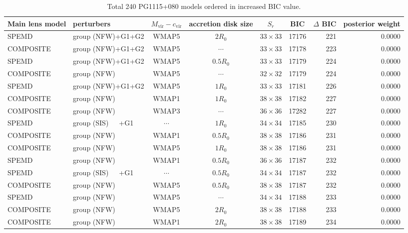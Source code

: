 \documentclass[useAMS,usenatbib]{mnras}
\def\nomicro{$\cdots$}
\def\nodata{$\cdots$}
\begin{document}
\begin{table}
    \centering
    \caption{Total 240 PG1115+080 models ordered in increased BIC value.}
    \label{tab:6TD}
    \begin{tabular}{llccccrr}
        \hline
        Main lens model & perturbers &$M_{\textrm{vir}}-c_{\textrm{vir}}$& accretion disk size & $S_{r}$ & BIC & $\Delta$ BIC & posterior weight\\
        \hline
        SPEMD     & group (NFW)+G1+G2 &WMAP5 & $2R_{0}$&$33\times33$ & 17176 & 221 & 0.0000\\
        COMPOSITE & group (NFW)+G1+G2 &WMAP5 & \nomicro&$33\times33$ & 17178 & 223 & 0.0000\\
        SPEMD     & group (NFW)+G1+G2 &WMAP5 & $0.5R_{0}$&$33\times33$ & 17179 & 224 & 0.0000\\
        COMPOSITE & group (NFW)       &WMAP5 & \nomicro&$32\times32$ & 17179 & 224 & 0.0000\\
        SPEMD     & group (NFW)+G1+G2 &WMAP5 & $1R_{0}$&$33\times33$ & 17181 & 226 & 0.0000\\
        COMPOSITE & group (NFW)       &WMAP1 & $1R_{0}$&$38\times38$ & 17182 & 227 & 0.0000\\
        COMPOSITE & group (NFW)       &WMAP3 & \nomicro&$36\times36$ & 17282 & 227 & 0.0000\\
        SPEMD     & group (SIS)~~~+G1 &\nodata& $1R_{0}$&$34\times34$ & 17185 & 230 & 0.0000\\
        COMPOSITE & group (NFW)       &WMAP1 & $0.5R_{0}$&$38\times38$ & 17186 & 231 & 0.0000\\
        COMPOSITE & group (NFW)       &WMAP5 & $1R_{0}$&$38\times38$   & 17186 & 231 & 0.0000\\
        SPEMD     & group (NFW)       &WMAP1 & $0.5R_{0}$&$36\times36$ & 17187 & 232 & 0.0000\\
        SPEMD     & group (SIS)~~~+G1 &\nodata& $0.5R_{0}$&$34\times34$& 17187 & 232 & 0.0000\\
        COMPOSITE & group (NFW)       &WMAP5 & $0.5R_{0}$&$38\times38$ & 17187 & 232 & 0.0000\\
        SPEMD     & group (NFW)       &WMAP5 & \nomicro&$34\times34$   & 17188 & 233 & 0.0000\\
        COMPOSITE & group (NFW)       &WMAP5 & $2R_{0}$&$38\times38$   & 17188 & 233 & 0.0000\\
        COMPOSITE & group (NFW)       &WMAP1 & $2R_{0}$&$38\times38$   & 17189 & 234 & 0.0000\\

\end{tabular}
\end{table}
\end{document}

